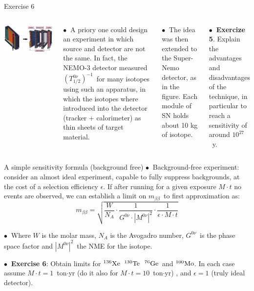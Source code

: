 \documentclass [aspectratio=169]{beamer}
\newcommand{\mbb}{\ensuremath{m_{\beta\beta}}}
\newcommand{\tonu}{\ensuremath{(T_{1/2}^{0\nu})^{-1}}}
\newcommand{\gonu}{\ensuremath{G^{0\nu}}}
\newcommand{\monu}{\ensuremath{|M^{0\nu}|^2}}
\newcommand{\XE}{\ensuremath{{}^{136}{\rm Xe}}}
\newcommand{\GE}{\ensuremath{{}^{76}{\rm Ge}}}
\newcommand{\TE}{\ensuremath{{}^{130}{\rm Te}}}
\newcommand{\MO}{\ensuremath{{}^{100}{\rm Mo}}}
\begin{document}
\begin{frame}{Exercise 6}
\begin{columns}
\includegraphics[scale=0.20]{snemo.png}

$\bullet~$ A priory one could design an experiment in which source and detector are not the same. In fact, the NEMO-3 detector measured \tonu\ for many isotopes using such an apparatus, in which the isotopes where introduced into the detector (tracker + calorimeter) as thin sheets of target material.    

$\bullet~$ The idea was then extended to the Super-Nemo detector, as in the figure. Each module of SN holds about 10 kg of isotope. 

$\bullet~$ {\bf Exercize 5}. Explain the advantages and disadvantages of the technique, in particular to reach a sensitivity of around $10^{27}$~y.   

\end{columns}
\end{frame}

\begin{frame}{A simple sensitivity formula (background free)}
$\bullet~$ Background-free experiment: consider an almost ideal experiment, capable to fully suppress backgrounds, at the cost of a selection efficiency $\epsilon$. If after running for a given exposure $M \cdot t$ no events are observed, we can establish a limit on \mbb\, to first approximation as:
\[
\mbb = \sqrt{\frac{W}{N_A}\cdot \frac{1}{\gonu\cdot\monu}\cdot \frac{1}{\epsilon\cdot M \cdot t}}
\]

$\bullet~$ Where $W$ is the molar mass, $N_A$ is the Avogadro number, \gonu\ is the phase space factor and \monu\ the NME for the isotope. 

$\bullet~$ {\bf Exercise 6}: Obtain limits for \XE\, \TE\, \GE\ and \MO. In each case assume
$M \cdot t = 1$~ton$\cdot$yr (do it also for $M \cdot t = 10$~ton$\cdot$yr) , and $\epsilon =1$ (truly ideal detector). 
\end{frame}
\end{document}
